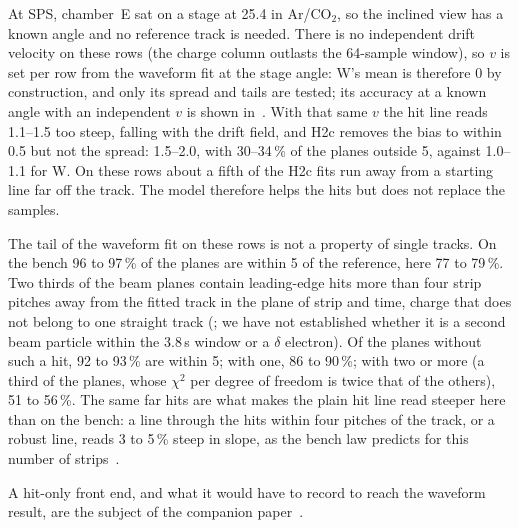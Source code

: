 At SPS, chamber~E sat on a stage at 25.4\textdegree{} in Ar/CO$_2$, so the inclined view has a known angle and no
reference track is needed. There is no independent drift velocity on these rows (the charge column outlasts the
64-sample window), so $v$ is set per row from the waveform fit at the stage angle: W's mean is therefore 0 by
construction, and only its spread and tails are tested; its accuracy at a known angle with an independent $v$ is
shown in~\cite{paperI}. With that same $v$ the hit line reads 1.1--1.5\textdegree{} too steep, falling with the
drift field, and H2c removes the bias to within 0.5\textdegree{} but not the spread: 1.5--2.0\textdegree, with
30--34\,\% of the planes outside 5\textdegree, against 1.0--1.1\textdegree{} for W. On these rows about a fifth of
the H2c fits run away from a starting line far off the track. The model therefore helps the hits but does not
replace the samples.

The tail of the waveform fit on these rows is not a property of single tracks. On the bench 96 to 97\,\% of the
planes are within 5\textdegree{} of the reference, here 77 to 79\,\%. Two thirds of the beam planes contain
leading-edge hits more than four strip pitches away from the fitted track in the plane of strip and time, charge
that does not belong to one straight track (\cite{paperIIb}; we have not established whether it is a second beam
particle within the 3.8\,\textmu s window or a $\delta$ electron). Of the planes without such a hit, 92 to 93\,\% are
within 5\textdegree; with one, 86 to 90\,\%; with two or more (a third of the planes, whose $\chi^2$ per degree of
freedom is twice that of the others), 51 to 56\,\%. The same far hits are what makes the plain hit line read steeper
here than on the bench: a line through the hits within four pitches of the track, or a robust line, reads 3 to
5\,\% steep in slope, as the bench law predicts for this number of strips~\cite{paperIIb}.

\begin{table}[tbp]
  \centering
  \small
  \caption{Track angle from the hits and from the waveforms on the same planes. Hits: on chamber~A the production
  hit line H0, mapped to the reference angle by a linear fit trained on the other half of the events; on chamber~E the
  hit line with the row's drift velocity. H2c: the forward model fitted to the hit lists (one time and amplitude per
  strip). W: the forward model fitted to the sampled waveforms. $d$ is the reconstructed minus the reference angle;
  $s_{68}$ is the 68th percentile of $|d-\tilde d|$ over $|d|\le5$\textdegree{} ($\tilde d$ the median), in5 the
  fraction of planes with $|d|\le5$\textdegree, and steep the median of $d\,\mathrm{sign}(\tan\theta_\mathrm{ref})$
  over $|d|\le5$\textdegree{} ($>0$: reads too steep). Chamber~A: pass 1, Run 1 and Run 2 of~\cite{paperI}, against
  M3 (the widths include the reference's error). Chamber~E: 3000 planes per row; $v$ is set per row from W at the
  stage angle, so W's steep is 0 by construction.}
  \label{tab:tiers}
  
\end{table}

A hit-only front end, and what it would have to record to reach the waveform result, are the subject of the
companion paper~\cite{paperIIb}.
